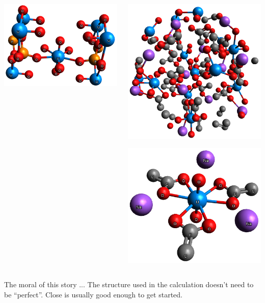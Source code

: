 \documentclass[10pt, xcolor=x11names, compress]{beamer}
\begin{document}
\begin{frame}
\begin{columns}[T]
\begin{column}{0.5\linewidth}
\begin{center}
        \includegraphics[width=0.5\linewidth]{mfc/upo4_full.png}
      \end{center}
    \end{column}
    \begin{column}{0.5\linewidth}
      \begin{center}
        \includegraphics[width=0.4\linewidth]{mfc/NaU_triacetate_full.png}

        \includegraphics[width=0.5\linewidth]{mfc/NaU_triacetate.png}
      \end{center}
    \end{column}
  \end{columns}
  \begin{block}{The moral of this story ...}
    The structure used in the {\feff} calculation doesn't need to be
    ``perfect''.  Close is usually good enough to get started.
  \end{block}
\end{frame}
\end{document}
